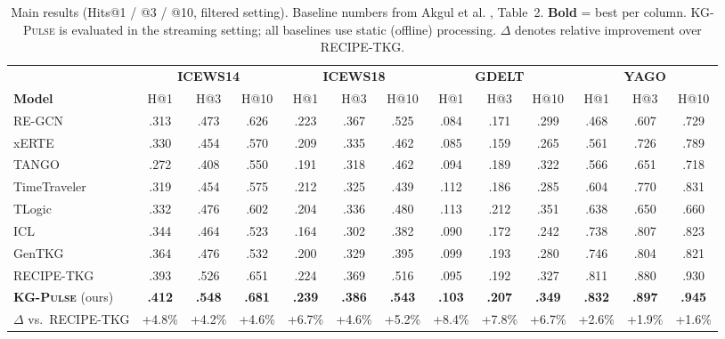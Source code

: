 \documentclass[10pt,a4paper,twocolumn]{article}
\theoremstyle{definition}
\newcommand{\ourmodel}{\textsc{KG-Pulse}}
\newcommand{\basemodel}{RECIPE-TKG}
\begin{document}
\begin{table}[t]
\centering
\caption{%
  Main results (Hits@1 / @3 / @10, filtered setting).
  Baseline numbers from Akgul et al. \cite{Akgul2025recipe}, Table~2.
  \textbf{Bold} = best per column.
  \ourmodel{} is evaluated in the streaming setting;
  all baselines use static (offline) processing.
  $\Delta$ denotes relative improvement over \basemodel{}.
}
\label{tab:main}
\scriptsize
\renewcommand{\arraystretch}{1.25}
\setlength{\tabcolsep}{3.5pt}
\begin{tabular}{l ccc ccc ccc ccc}
\toprule
& \multicolumn{3}{c}{\textbf{ICEWS14} \cite{Boschee2015icews}}
& \multicolumn{3}{c}{\textbf{ICEWS18} \cite{Boschee2015icews}}
& \multicolumn{3}{c}{\textbf{GDELT} \cite{Leetaru2013gdelt}}
& \multicolumn{3}{c}{\textbf{YAGO} \cite{Mahdisoltani2015yago}} \\
\cmidrule(lr){2-4}\cmidrule(lr){5-7}\cmidrule(lr){8-10}\cmidrule(lr){11-13}
\textbf{Model} & H@1&H@3&H@10 & H@1&H@3&H@10 & H@1&H@3&H@10 & H@1&H@3&H@10\\
\midrule
RE-GCN       &.313&.473&.626 &.223&.367&.525 &.084&.171&.299 &.468&.607&.729\\
xERTE        &.330&.454&.570 &.209&.335&.462 &.085&.159&.265 &.561&.726&.789\\
TANGO        &.272&.408&.550 &.191&.318&.462 &.094&.189&.322 &.566&.651&.718\\
TimeTraveler &.319&.454&.575 &.212&.325&.439 &.112&.186&.285 &.604&.770&.831\\
TLogic       &.332&.476&.602 &.204&.336&.480 &.113&.212&.351 &.638&.650&.660\\
ICL          &.344&.464&.523 &.164&.302&.382 &.090&.172&.242 &.738&.807&.823\\
GenTKG       &.364&.476&.532 &.200&.329&.395 &.099&.193&.280 &.746&.804&.821\\
\basemodel{} &.393&.526&.651 &.224&.369&.516 &.095&.192&.327 &.811&.880&.930\\
\midrule
\textbf{\ourmodel{}} (ours)
             &\textbf{.412}&\textbf{.548}&\textbf{.681}
             &\textbf{.239}&\textbf{.386}&\textbf{.543}
             &\textbf{.103}&\textbf{.207}&\textbf{.349}
             &\textbf{.832}&\textbf{.897}&\textbf{.945}\\
$\Delta$ vs.\ \basemodel{}
             &+4.8\%&+4.2\%&+4.6\%
             &+6.7\%&+4.6\%&+5.2\%
             &+8.4\%&+7.8\%&+6.7\%
             &+2.6\%&+1.9\%&+1.6\%\\
\bottomrule
\end{tabular}
\end{table}
\end{document}
